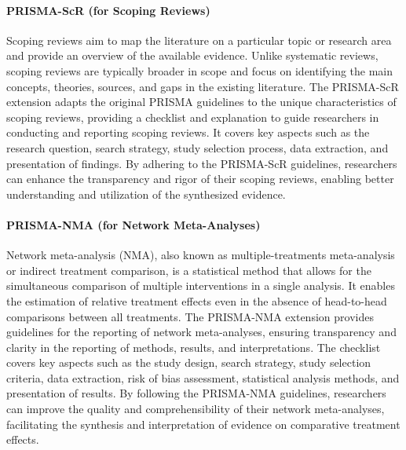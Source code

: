 \documentclass{article}
\begin{document}
\paragraph*{PRISMA-ScR (for Scoping Reviews)}
Scoping reviews aim to map the literature on a particular topic or research area and provide an overview of the available evidence. Unlike systematic reviews, scoping reviews are typically broader in scope and focus on identifying the main concepts, theories, sources, and gaps in the existing literature. The PRISMA-ScR \cite{tricco2018prisma} extension adapts the original PRISMA guidelines to the unique characteristics of scoping reviews, providing a checklist and explanation to guide researchers in conducting and reporting scoping reviews. It covers key aspects such as the research question, search strategy, study selection process, data extraction, and presentation of findings. By adhering to the PRISMA-ScR guidelines, researchers can enhance the transparency and rigor of their scoping reviews, enabling better understanding and utilization of the synthesized evidence.




\paragraph*{PRISMA-NMA (for Network Meta-Analyses)}

Network meta-analysis (NMA), also known as multiple-treatments meta-analysis or indirect treatment comparison, is a statistical method that allows for the simultaneous comparison of multiple interventions in a single analysis. It enables the estimation of relative treatment effects even in the absence of head-to-head comparisons between all treatments. The PRISMA-NMA \cite{hutton2015prisma} extension provides guidelines for the reporting of network meta-analyses, ensuring transparency and clarity in the reporting of methods, results, and interpretations. The checklist covers key aspects such as the study design, search strategy, study selection criteria, data extraction, risk of bias assessment, statistical analysis methods, and presentation of results. By following the PRISMA-NMA guidelines, researchers can improve the quality and comprehensibility of their network meta-analyses, facilitating the synthesis and interpretation of evidence on comparative treatment effects.
\end{document}
